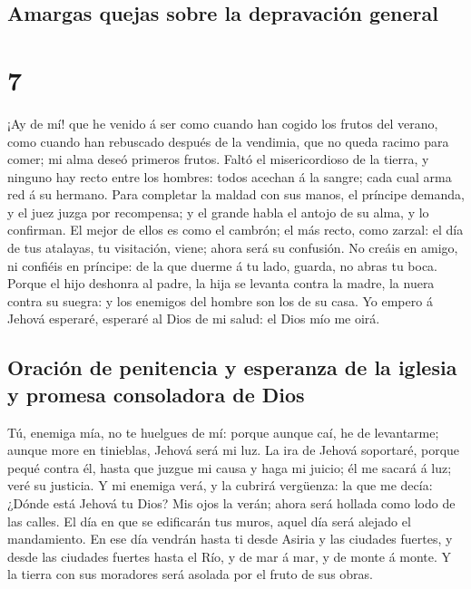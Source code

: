\hypertarget{amargas-quejas-sobre-la-depravaciuxf3n-general}{%
\subsection{Amargas quejas sobre la depravación
general}\label{amargas-quejas-sobre-la-depravaciuxf3n-general}}

\hypertarget{section-6}{%
\section{7}\label{section-6}}

 ¡Ay de mí! que he venido á ser como cuando han cogido los
frutos del verano, como cuando han rebuscado después de la vendimia, que
no queda racimo para comer; mi alma deseó primeros frutos. 
Faltó el misericordioso de la tierra, y ninguno hay recto entre los
hombres: todos acechan á la sangre; cada cual arma red á su hermano.
 Para completar la maldad con sus manos, el príncipe
demanda, y el juez juzga por recompensa; y el grande habla el antojo de
su alma, y lo confirman.  El mejor de ellos es como el
cambrón; el más recto, como zarzal: el día de tus atalayas, tu
visitación, viene; ahora será su confusión.  No creáis en
amigo, ni confiéis en príncipe: de la que duerme á tu lado, guarda, no
abras tu boca.  Porque el hijo deshonra al padre, la hija se
levanta contra la madre, la nuera contra su suegra: y los enemigos del
hombre son los de su casa.  Yo empero á Jehová esperaré,
esperaré al Dios de mi salud: el Dios mío me oirá.

\hypertarget{oraciuxf3n-de-penitencia-y-esperanza-de-la-iglesia-y-promesa-consoladora-de-dios}{%
\subsection{Oración de penitencia y esperanza de la iglesia y promesa
consoladora de
Dios}\label{oraciuxf3n-de-penitencia-y-esperanza-de-la-iglesia-y-promesa-consoladora-de-dios}}

 Tú, enemiga mía, no te huelgues de mí: porque aunque caí,
he de levantarme; aunque more en tinieblas, Jehová será mi luz.
 La ira de Jehová soportaré, porque pequé contra él, hasta
que juzgue mi causa y haga mi juicio; él me sacará á luz; veré su
justicia.  Y mi enemiga verá, y la cubrirá vergüenza: la
que me decía: ¿Dónde está Jehová tu Dios? Mis ojos la verán; ahora será
hollada como lodo de las calles.  El día en que se
edificarán tus muros, aquel día será alejado el mandamiento.
 En ese día vendrán hasta ti desde Asiria y las ciudades
fuertes, y desde las ciudades fuertes hasta el Río, y de mar á mar, y de
monte á monte.  Y la tierra con sus moradores será asolada
por el fruto de sus obras.

